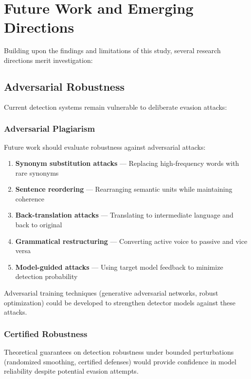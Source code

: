 \section{Future Work and Emerging Directions} \label{sec:future}

Building upon the findings and limitations of this study, several research directions merit investigation:

\subsection{Adversarial Robustness}

Current detection systems remain vulnerable to deliberate evasion attacks:

\subsubsection{Adversarial Plagiarism}

Future work should evaluate robustness against adversarial attacks:

\begin{enumerate}
  \item \textbf{Synonym substitution attacks} --- Replacing high-frequency words with rare synonyms
  \item \textbf{Sentence reordering} --- Rearranging semantic units while maintaining coherence
  \item \textbf{Back-translation attacks} --- Translating to intermediate language and back to original
  \item \textbf{Grammatical restructuring} --- Converting active voice to passive and vice versa
  \item \textbf{Model-guided attacks} --- Using target model feedback to minimize detection probability
\end{enumerate}

Adversarial training techniques (generative adversarial networks, robust optimization) could be developed to strengthen detector models against these attacks.

\subsubsection{Certified Robustness}

Theoretical guarantees on detection robustness under bounded perturbations (randomized smoothing, certified defenses) would provide confidence in model reliability despite potential evasion attempts.

